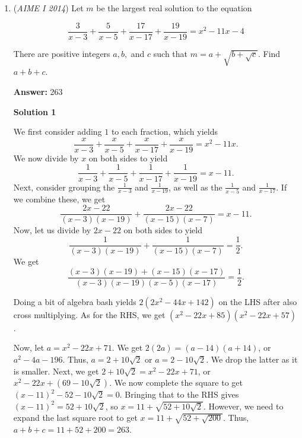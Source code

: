 \begin{enumerate}
Pluging in the expressions for $p',q'$, we have
 \[\frac{55}{136}=\frac{4+5u+4u^2+5u^3}{10(1+u^2)}\cdot\frac{5-u+5u^2}{10(1+u^2)}+\frac{4-4u+5u^2-5u^3}{20(1+u^2)}\]Or
 \[\frac{40+u+80u^2+u^3+40u^4}{25(1+2u^2+u^4)}=\frac{55}{34}\]Recall that $u=\frac{k}{s}\in (0,1)$. Solving the palindrome equation gives $u=\frac{3}{5}$. Therefore,
 \[s^2=\frac{34^2}{1+u^2}=34^2\cdot\frac{25}{34}=\boxed{850}\]



	\item (\textit{AIME I 2014}) Let $m$ be the largest real solution to the equation


 
 \[\dfrac{3}{x-3} + \dfrac{5}{x-5} + \dfrac{17}{x-17} + \dfrac{19}{x-19} = x^2 - 11x - 4\]


 There are positive integers $a, b,$ and $c$ such that $m = a + \sqrt{b + \sqrt{c}}$. Find $a+b+c$.


 
 \textbf{Answer: }263



\textbf{Solution 1}

We first consider adding $1$ to each fraction, which yields 
 \[\frac{x}{x-3} + \frac{x}{x-5} + \frac{x}{x-17} + \frac{x}{x-19} = x^2-11x.\] We now divide by $x$ on both sides to yield 
 \[\frac{1}{x-3}+\frac{1}{x-5}+\frac{1}{x-17}+\frac{1}{x-19} = x-11.\] Next, consider grouping the $\frac{1}{x-3}$ and $\frac{1}{x-19}$, as well as the $\frac{1}{x-5}$ and $\frac{1}{x-17}$. If we combine these, we get 
 \[\frac{2x-22}{(x-3)(x-19)} + \frac{2x-22}{(x-15)(x-7)} = x-11.\] Now, let us divide by $2x-22$ on both sides to yield 
 \[\frac{1}{(x-3)(x-19)} + \frac{1}{(x-15)(x-7)} = \frac{1}{2}.\] We get 
 \[\frac{(x-3)(x-19)+(x-15)(x-17)}{(x-3)(x-19)(x-5)(x-17)} = \frac{1}{2}.\] 

 Doing a bit of algebra bash yields $2(2x^2-44x+142)$ on the LHS after also cross multiplying. As for the RHS, we get $(x^2-22x+85)(x^2-22x+57)$. 

 Now, let $a=x^2-22x+71$. We get $2(2a)=(a-14)(a+14)$, or $a^2-4a-196$. Thus, $a=2+10\sqrt2$ or $a=2-10\sqrt2$. We drop the latter as it is smaller. Next, we get $2+10\sqrt{2}=x^2-22x+71$, or $x^2-22x+(69-10\sqrt2)$. We now complete the square to get $(x-11)^2 - 52 -10\sqrt2=0$. Bringing that to the RHS gives $(x-11)^2=52+10\sqrt2$, so $x=11+\sqrt{52+10\sqrt{2}}$. However, we need to expand the last square root to get $x=11+\sqrt{52+\sqrt{200}}$. Thus, $a+b+c=11+52+200=\boxed{263}$.


\end{enumerate}
